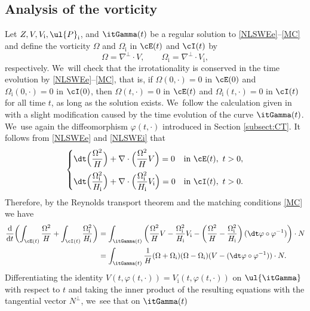 \subsection{Analysis of the vorticity}\label{sectvort}
Let $Z,V,V_\mathrm{i},\ul{P}_\mathrm{i}$, and $\itGamma(t)$ be a regular solution to \eqref{NLSWEe}--\eqref{MC} and define the vorticity $\Omega$
and $\Omega_\mathrm{i}$ in $\cE(t)$ and $\cI(t)$ by
\[
\Omega = \nabla^\perp\cdot V, \qquad \Omega_\mathrm{i} = \nabla^\perp\cdot V_\mathrm{i},
\]
respectively. We~will check that the irrotationality is conserved in the time evolution by \eqref{NLSWEe}--\eqref{MC}, that is,
if $\Omega(0,\cdot)=0$ in $\cE(0)$ and $\Omega_\mathrm{i}(0,\cdot)=0$ in $\cI(0)$,
then $\Omega(t,\cdot)=0$ in $\cE(t)$ and $\Omega_\mathrm{i}(t,\cdot)=0$ in $\cI(t)$ for all time $t$, as long as the solution exists. We~follow the calculation given in \cite[Section 2.4]{IguchiLannes2023} with a slight modification caused by the time evolution of the curve $\itGamma(t)$. We~use again the diffeomorphism $\varphi(t,\cdot)$ introduced in Section \ref{subsect:CT}.
It follows from \eqref{NLSWEe} and \eqref{NLSWEi} that
\[
\begin{cases}
\dt\Bigl(\dfrac{\Omega^2}{H}\Bigr) + \nabla\cdot\Bigl(\dfrac{\Omega^2}{H}V\Bigr)=0 &\text{in } \cE(t), \ t>0, \\[8pt]
\dt\Bigl(\dfrac{\Omega_\mathrm{i}^2}{H_\mathrm{i}}\Bigr)
+ \nabla\cdot\Bigl(\dfrac{\Omega_\mathrm{i}^2}{H_\mathrm{i}}V_\mathrm{i}\Bigr)=0 &\text{in } \cI(t), \ t>0.
\end{cases}
\]
Therefore, by the Reynolds transport theorem and the matching conditions \eqref{MC} we have
\begin{align}
\frac{\rm d}{{\rm d}t}\biggl(\int_{\cE(t)}\frac{\Omega^2}{H} + \int_{\cI(t)}\frac{\Omega_\mathrm{i}^2}{H_\mathrm{i}} \biggr)
&= \int_{\itGamma(t)} \left(\frac{\Omega^2}{H}V - \frac{\Omega_\mathrm{i}^2}{H_\mathrm{i}}V_\mathrm{i}
- \left(\frac{\Omega^2}{H} - \frac{\Omega_\mathrm{i}^2}{H_\mathrm{i}} \right)(\dt\varphi\circ\varphi^{-1}) \right)\cdot N \notag\\
\label{vorticity}
\\[-15pt]
&= \int_{\itGamma(t)} \frac{1}{H}(\Omega+\Omega_\mathrm{i})(\Omega-\Omega_\mathrm{i})(V-(\dt\varphi\circ\varphi^{-1}))\cdot N.\notag
\end{align}
Differentiating the identity $V(t,\varphi(t,\cdot))=V_\mathrm{i}(t,\varphi(t,\cdot))$ on $\ul{\itGamma}$ with respect to $t$ and taking the inner product of the
resulting equations with the tangential vector $N^\perp$, we~see that on $\itGamma(t)$
